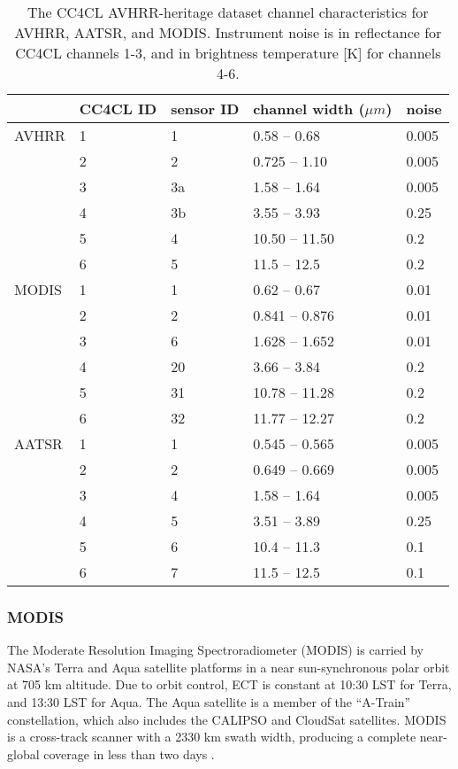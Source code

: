 \begin{table}[h]
  \caption{The CC4CL AVHRR-heritage dataset channel characteristics for AVHRR, AATSR, and MODIS. Instrument noise is in reflectance for CC4CL channels 1-3, and in brightness temperature [K] for channels 4-6.}
  \begin{tabular}{l|p{0.7cm}p{0.7cm}p{1.8cm}p{0.5cm}}
    \hline
    & CC4CL ID & sensor ID & channel width ($\mu m$) & noise \\
    \hline
    AVHRR & 1 & 1 & 0.58 -- 0.68 & 0.005 \\
          & 2 & 2 & 0.725 -- 1.10 & 0.005 \\
          & 3 & 3a & 1.58 -- 1.64 & 0.005 \\
          & 4 & 3b & 3.55 -- 3.93 & 0.25 \\
          & 5 & 4 & 10.50 -- 11.50 & 0.2 \\
          & 6 & 5 & 11.5 -- 12.5 & 0.2 \\
    \hline
    MODIS & 1 & 1 & 0.62 -- 0.67 & 0.01 \\
          & 2 & 2 & 0.841 -- 0.876 & 0.01 \\
          & 3 & 6 & 1.628 -- 1.652 & 0.01 \\
          & 4 & 20 & 3.66 -- 3.84 & 0.2 \\
          & 5 & 31 & 10.78 -- 11.28 & 0.2 \\
          & 6 & 32 & 11.77 -- 12.27 & 0.2 \\
    \hline
    AATSR & 1 & 1 & 0.545 -- 0.565 & 0.005 \\
          & 2 & 2 & 0.649 -- 0.669 & 0.005 \\
          & 3 & 4 & 1.58 -- 1.64 & 0.005 \\
          & 4 & 5 & 3.51 -- 3.89 & 0.25 \\
          & 5 & 6 & 10.4 -- 11.3 & 0.1 \\
          & 6 & 7 & 11.5 -- 12.5 & 0.1 \\
    \hline
  \end{tabular}
  \label{tab:channels}
\end{table}

\subsubsection{MODIS}

The Moderate Resolution Imaging Spectroradiometer (MODIS) is carried by NASA's Terra and Aqua satellite platforms in a near sun-synchronous polar orbit at 705 km altitude. Due to orbit control, ECT is constant at 10:30 LST for Terra, and 13:30 LST for Aqua. The Aqua satellite is a member of the ``A-Train'' constellation, which also includes the CALIPSO and CloudSat satellites. MODIS is a cross-track scanner with a 2330 km swath width, producing a complete near-global coverage in less than two days \citep{Xiong09}.

